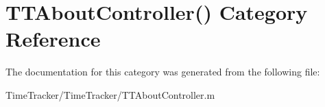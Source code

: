 \hypertarget{category_t_t_about_controller_07_08}{\section{T\-T\-About\-Controller() Category Reference}
\label{category_t_t_about_controller_07_08}
}


The documentation for this category was generated from the following file\-:\begin{DoxyCompactItemize}
\item 
Time\-Tracker/\-Time\-Tracker/T\-T\-About\-Controller.\-m\end{DoxyCompactItemize}
